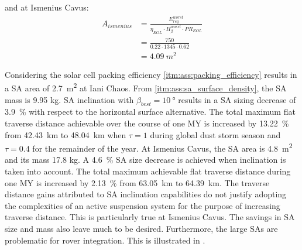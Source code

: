 and at Ismenius Cavus:
\begin{align}
  \label{calc:solar_cell_area_ismenius_cavus_traverse}
  A_{ismenius} &= \frac{E_{req}^{worst}}{\eta_{EOL} \cdot H_{\beta}^{worst} \cdot PR_{EOL}}\\
               &= \frac{750}{0.22 \cdot 1345 \cdot 0.62}\\
               &= \SI{4.09}{m^{2}}
\end{align}

Considering the solar cell packing efficiency \ref{itm:ass:packing_efficiency} results in a \ac{SA} area of \SI{2.7}{m^{2}} at Iani Chaos. From \ref{itm:ass:sa_surface_density}, the \ac{SA} mass is 9.95 \si{\kilo\gram}. \ac{SA} inclination with $\beta_{best} = \SI{10}{\degree}$ results in a \ac{SA} sizing decrease of \SI{3.9}{\percent} with respect to the horizontal surface alternative. The total maximum flat traverse distance achievable over the course of one \ac{MY} is increased by \SI{13.22}{\percent} from \SI{42.43}{\kilo\meter} to \SI{48.04}{\kilo\meter} when $\tau = 1$ during global dust storm season and $\tau = 0.4$ for the remainder of the year. At Ismenius Cavus, the \ac{SA} area is \SI{4.8}{m^{2}} and its mass 17.8 \si{\kilo\gram}. A \SI{4.6}{\percent} \ac{SA} size decrease is achieved when inclination is taken into account. The total maximum achievable flat traverse distance during one \ac{MY} is increased by \SI{2.13}{\percent} from \SI{63.05}{\kilo\meter} to \SI{64.39}{\kilo\meter}. The traverse distance gains attributed to \ac{SA} inclination capabilities do not justify adopting the complexities of an active suspension system for the purpose of increasing traverse distance. This is particularly true at Ismenius Cavus. The savings in \ac{SA} size and mass also leave much to be desired. Furthermore, the large \acp{SA} are problematic for rover integration. This is illustrated in .

